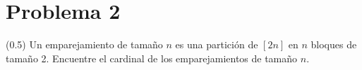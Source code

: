 \section*{Problema 2}
(0.5) Un emparejamiento de tamaño $n$ es una partición de $[2n]$ en $n$ bloques de tamaño 2. Encuentre el cardinal de los emparejamientos de tamaño $n$.
